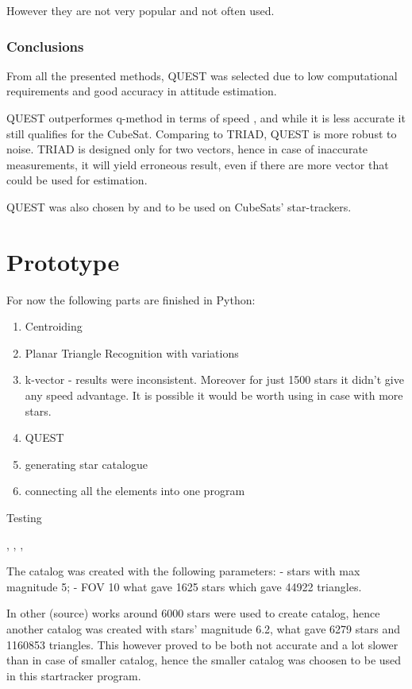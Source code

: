 \documentclass[12pt,a4paper,oneside]{article}
\begin{document}
However they are not very popular and not often used.

\subsubsection{Conclusions}


From all the presented methods, QUEST was selected due to low computational requirements and good accuracy in attitude estimation.

QUEST outperformes q-method in terms of speed \cite{markley1999estimate}, and while it is less accurate it still qualifies for the CubeSat. Comparing to TRIAD, QUEST is more robust to noise. TRIAD is designed only for two vectors, hence in case of inaccurate measurements, it will yield erroneous result, even if there are more vector that could be used for estimation.

QUEST was also chosen by \citet{huffman2006designing} and \citet{tappe2009development} to be used on CubeSats' star-trackers.

\newpage
\section{Prototype}
For now the following parts are finished in Python:
\begin{enumerate}
\item Centroiding
\item Planar Triangle Recognition with variations
\item k-vector - results were inconsistent. Moreover for just 1500 stars it didn't give any speed advantage. It is possible it would be worth using in case with more stars.
\item QUEST
\item generating star catalogue
\item connecting all the elements into one program
\end{enumerate}
Testing\par
\citet{kruijff2003star}, \citet{kruijff2003automated}, \citet{dzamba2014ground}, 

The catalog was created with the following parameters:
- stars with max magnitude 5;
- FOV 10\degree
what gave 1625 stars which gave 44922 triangles.

In other (source) works around 6000 stars were used to create catalog, hence another catalog was created with stars' magnitude 6.2, what gave 6279 stars and 1160853 triangles. This however proved to be both not accurate and a lot slower than in case of smaller catalog, hence the smaller catalog was choosen to be used in this startracker program.
\end{document}

